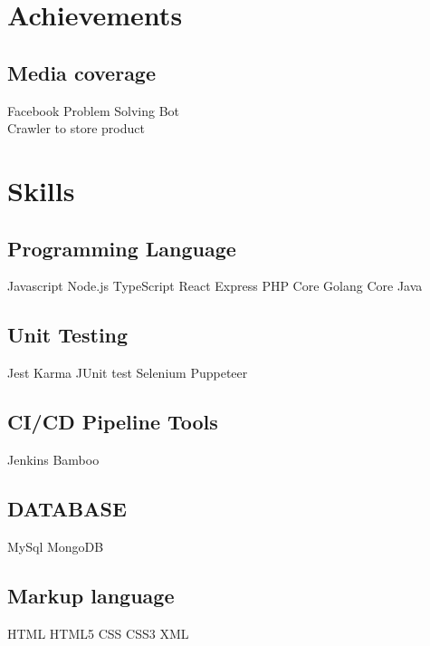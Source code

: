 \documentclass[]{deedy-resume-openfont}
\begin{document}
\begin{minipage}[t]{0.33\textwidth}

\section{Achievements}
\subsection{Media coverage}
\textbullet{} Facebook Problem Solving Bot
\\
\vspace{\topsep}
\textbullet{} Crawler to store product
\\
\sectionsep


\section{Skills}
\subsection{Programming Language}
Javascript \textbullet{} Node.js \textbullet{} TypeScript \textbullet{} React \textbullet{} Express \textbullet{} PHP \textbullet{} Core Golang \textbullet{} Core Java
\sectionsep
\subsection{Unit Testing}
Jest \textbullet{}   Karma \textbullet{} JUnit test \textbullet{} Selenium \textbullet{} Puppeteer
\sectionsep
\subsection{CI/CD Pipeline Tools}
Jenkins \textbullet{}   Bamboo
\sectionsep
\subsection{DATABASE}
MySql \textbullet{} MongoDB
\sectionsep
\subsection{Markup language}
HTML \textbullet{} HTML5 \textbullet{} CSS \textbullet{} CSS3 \textbullet{} XML
\sectionsep

\end{minipage}
\end{document}
